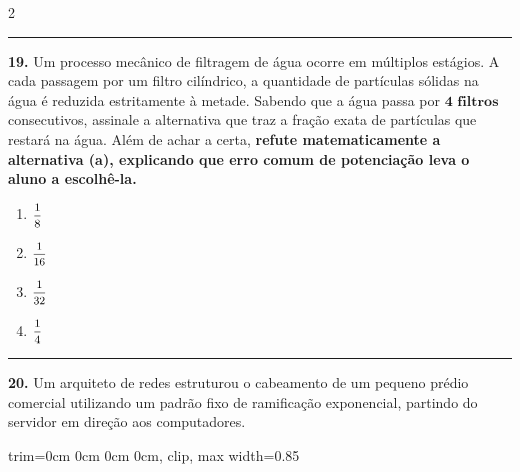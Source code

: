 \documentclass[twoside, 10pt, a4paper]{article}
\newlength{\espacoPreQuestao}\setlength{\espacoPreQuestao}{0.1cm}
\newlength{\espacoQuestao}\setlength{\espacoQuestao}{0.2cm}
\newcommand{\larguraTikz}{0.85\linewidth}
\begin{document}
\begin{multicols*}{2}
\noindent\textcolor{CorLinha}{\rule{\linewidth}{0.5pt}} 
\par\vspace{\espacoPreQuestao}
\textbf{19.} Um processo mecânico de filtragem de água ocorre em múltiplos estágios. A cada passagem por um filtro cilíndrico, a quantidade de partículas sólidas na água é reduzida estritamente à metade. Sabendo que a água passa por $ \textbf{4 filtros} $ consecutivos, assinale a alternativa que traz a fração exata de partículas que restará na água. Além de achar a certa, \textbf{refute matematicamente a alternativa (a), explicando que erro comum de potenciação leva o aluno a escolhê-la.}
\begin{enumerate}[label=\alph*)]
    \item $ \mfrac{1}{8} $
    \item $ \mfrac{1}{16} $
    \item $ \mfrac{1}{32} $
    \item $ \mfrac{1}{4} $
\end{enumerate}
\par\vspace{\espacoQuestao}

\noindent\textcolor{CorLinha}{\rule{\linewidth}{0.5pt}} 
\par\vspace{\espacoPreQuestao}
\textbf{20.} Um arquiteto de redes estruturou o cabeamento de um pequeno prédio comercial utilizando um padrão fixo de ramificação exponencial, partindo do servidor em direção aos computadores.
\begin{center}
\begin{adjustbox}{trim=0cm 0cm 0cm 0cm, clip, max width=\larguraTikz}
\end{adjustbox}
\end{center}
\end{multicols*}
\end{document}
